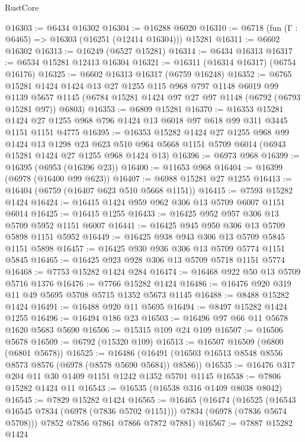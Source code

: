 \begin{lexlean}{RustCore}
\begin{coremodule}
@16303 := @6434 @16302
@16304 := @16288 @6020
@16310 := @6718 (fun (Γ : @6465) => @16303 (@16251 (@12414 @16304))) @15281
@16311 := @6602 @16302
@16313 := @16249 (@6527 @15281)
@16314 := @6434 @16313
@16317 := @6534 @15281 @12413 @16304
@16321 := @16311 (@16314 @16317) (@6754 @16176)
@16325 := @6602 @16313 @16317 (@6759 @16248)
@16352 := @6765
    @15281
    @1424
    @1424
    @13
    @27
    @1255
    @115
    @968
    @797
    @1148
    @6019
    @99
    @1139
    @5657
    @1145
    (@6784 @15281 @1424 @97 @27 @97 @1148 (@6792 (@6793 @15281 @97)) @6803)
@16353 := @6809 @15281
@16370 := @16353
    @15281
    @1424
    @27
    @1255
    @968
    @796
    @1424
    @13
    @6018
    @97
    @618
    @99
    @311
    @3445
    @1151
    @1151
    @4775
@16395 := @16353
    @15282
    @1424
    @27
    @1255
    @968
    @99
    @1424
    @13
    @1298
    @23
    @623
    @510
    @964
    @5668
    @1151
    @5709
    @6014
    (@6943 @15281 @1424 @27 @1255 @968 @1424 @13)
@16396 := @6973 @968
@16399 := @16395 (@6953 (@16396 @23))
@16400 := @11653 @968
@16404 := @16399 (@6978 (@16400 @99 @623))
@16407 := @6988 @15281 @27 @1255
@16413 := @16404 (@6759 (@16407 @623 @510 @5668 @1151))
@16415 := @7593 @15282 @1424
@16424 := @16415 @1424 @959 @962 @306 @13 @5709 @6007 @1151 @6014
@16425 := @16415 @1255
@16433 := @16425 @952 @957 @306 @13 @5709 @5952 @1151 @6007
@16441 := @16425 @945 @950 @306 @13 @5709 @5898 @1151 @5952
@16449 := @16425 @938 @943 @306 @13 @5709 @5845 @1151 @5898
@16457 := @16425 @930 @936 @306 @13 @5709 @5774 @1151 @5845
@16465 := @16425 @923 @928 @306 @13 @5709 @5718 @1151 @5774
@16468 := @7753 @15282 @1424 @284
@16474 := @16468 @922 @50 @13 @5709 @5716 @1376
@16476 := @7766 @15282 @1424
@16486 := @16476 @920 @319 @11 @49 @5695 @5708 @5715 @1352 @5673 @1145
@16488 := @8488 @15282 @1424
@16491 := @16488 @920 @11 @5695
@16494 := @8497 @15282 @1424 @1255
@16496 := @16494 @186 @23
@16503 := @16496 @97 @66 @11 @5678 @1620 @5683 @5690
@16506 := @15315 @109 @24 @109
@16507 := @16506 @5678
@16509 := @6792 (@15320 @109)
@16513 := @16507 @16509 (@6800 (@6801 @5678))
@16525 := @16486 (@16491 (@16503 @16513 @8548 @8556 @8573 @8576 (@6978 (@8578 @5690 @5684)) @8586))
@16535 := @16476 @317 @204 @11 @30 @1409 @1151 @1242 @1352 @5701 @1145
@16538 := @7806 @15282 @1424 @11
@16543 := @16535 (@16538 @316 @1409 @8038 @8042)
@16545 := @7829 @15282 @1424
@16565 := @16465
    (@16474
      (@16525 (@16543 @16545 @7834 (@6978 (@7836 @5702 @1151))) @7834 (@6978 (@7836 @5674 @5708)))
      @7852
      @7856
      @7861
      @7866
      @7872
      @7881)
@16567 := @7887 @15282 @1424

\end{coremodule}
\end{lexlean}
